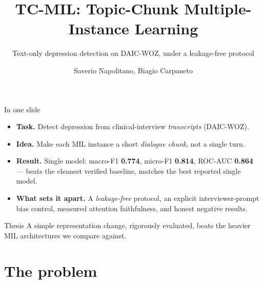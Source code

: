 \documentclass[10pt,aspectratio=169]{beamer}
\title{TC-MIL: Topic-Chunk Multiple-Instance Learning}
\subtitle{Text-only depression detection on DAIC-WOZ, under a leakage-free protocol}
\author{Saverio Napolitano, Biagio Carpaneto}
\date{}
\newcommand{\num}[1]{\textbf{#1}}
\begin{document}
\maketitle

\begin{frame}{In one slide}
  \begin{itemize}
    \item \textbf{Task.} Detect depression from clinical-interview \emph{transcripts} (DAIC-WOZ).
    \item \textbf{Idea.} Make each MIL instance a short \emph{dialogue chunk}, not a single turn.
    \item \textbf{Result.} Single model: macro-F1 \num{0.774}, micro-F1 \num{0.814}, ROC-AUC \num{0.864}
          --- beats the cleanest verified baseline, matches the best reported single model.
    \item \textbf{What sets it apart.} A \emph{leakage-free} protocol, an explicit
          interviewer-prompt bias control, measured attention faithfulness, and honest negative results.
  \end{itemize}
  \begin{alertblock}{Thesis}
    A simple representation change, rigorously evaluated, beats the heavier MIL architectures we compare against.
  \end{alertblock}
\end{frame}

\section{The problem}
\end{document}
